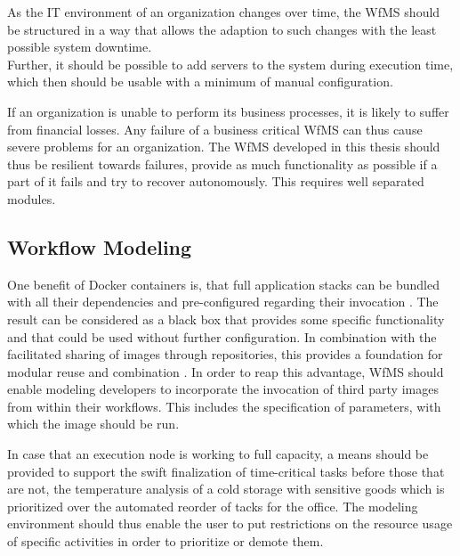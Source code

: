     As the IT environment of an organization changes over time, %
    the \ac{WfMS} should be structured in a way that allows the adaption to such changes with the least possible system downtime. \\
    Further, it should be possible to add servers to the system during execution time, which then should be usable with a minimum of manual configuration.

    If an organization is unable to perform its business processes, it is likely to suffer from financial losses. Any failure of a business critical \ac{WfMS} can thus cause severe problems for an organization. The \ac{WfMS} developed in this thesis should thus be resilient towards failures, \ie provide as much functionality as possible if a part of it fails and try to recover autonomously. This requires well separated modules.


\subsection*{Workflow Modeling} %
  \label{ssub:workflow_modeling}

    One benefit of Docker containers is, that full application stacks can be bundled with all their dependencies and pre-configured regarding their invocation \cite[p.~82]{Bernstein2014Containers}. The result can be considered as a black box that provides some specific functionality and that could be used without further configuration. In combination with the facilitated sharing of images through repositories, this provides a foundation for modular reuse and combination \cite[p.~6]{Boettiger2015Introduction}.
    In order to reap this advantage, \ac{WfMS} should enable modeling developers to incorporate the invocation of third party images from within their workflows. This includes the specification of parameters, with which the image should be run.

    In case that an execution node is working to full capacity, a means should be provided to support the swift finalization of time-critical tasks before those that are not, \eg the temperature analysis of a cold storage with sensitive goods which is prioritized over the automated reorder of tacks for the office. The modeling environment should thus enable the user to put restrictions on the resource usage of specific activities in order to prioritize or demote them.


